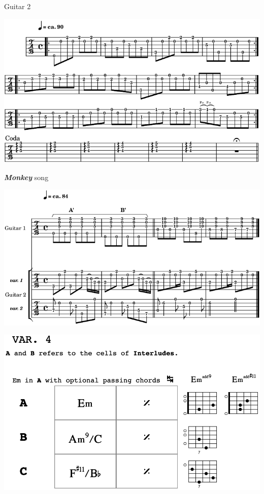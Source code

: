\bigskip

 \quad Guitar 2

\begin{center}
\includegraphics[width=\textwidth]{img/neE2}
\end{center}

\newpage
\textbf{\textsl{Monkey}} song
\begin{center}
\includegraphics[width=\textwidth]{img/neF}
\end{center}
\bigskip
\bigskip
\begin{center}
\includegraphics[width=\textwidth-3cm]{img/neFcc}
\end{center}



